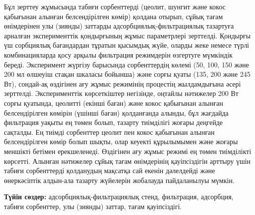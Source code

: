 Бұл зерттеу жұмысында табиғи сорбенттерді (цеолит, шунгит және кокос
қабығынан алынған белсендірілген көмір) қолдана отырып, сұйық тағам
өнімдерінен улы (зиянды) заттарды адсорб\-циялық-фильтрациялық тазартуға
арналған эксперименттік қондырғының жұмыс параметрлері зерттелді.
Қондырғы үш сорбциялық бағандардан тұратын қысымдық жүйе, оларды жеке
немесе түрлі комбинацияларда қосу арқылы фильтрация режимдерін өзгертуге
мүмкіндік береді. Эксперимент жүргізу барысында сорбенттердің көлемі
(50, 100, 150 және 200 мл өлшеуіш стақан шкаласы бойынша) және сорғы
қуаты (135, 200 және 245 Вт), сондай-ақ өздігінен ағу жұмыс режимінің
процестің жылдамдығына әсері зерттелді. Эксперименттік көрсеткіштер
негізінде, оңтайлы нәтижелер 200 Вт сорғы қуатында, цеолитті (екінші
баған) және кокос қабығынан алынған белсендірілген көмірін (үшінші
баған) қолданғанда алынды, бұл жағдайда фильтрация уақыты ең төмен
болып, тазарту тиімділігі жоғары деңгейде сақталды. Ең тиімді сорбенттер
цеолит пен кокос қабығынан алынған белсендірілген көмір болып шықты,
олар кеуекті құрылымымен және жоғары меншікті бетімен ерекшеленеді.
Өздігінен ағу жұмыс режимі ең төмен тиімділікті көрсетті. Алынған
нәтижелер сұйық тағам өнімдерінің қауіпсіздігін арттыру үшін табиғи
сорбенттерді қолданудың мақсатқа сай екенін дәлелдейді және өнеркәсіптік
алдын-ала тазарту жүйелерін жобалауда пайдаланылуы мүмкін.

{\bfseries Түйін сөздер:} адсорбциялық-фильтрациялық стенд, фильтрация,
адсорбция, табиғи сорбенттер, улы (зиянды) заттар, тағам қауіпсіздігі.

